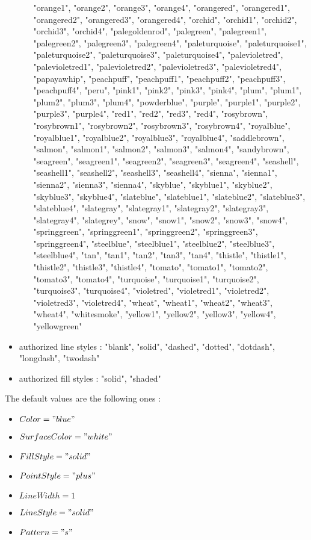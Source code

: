 \begin{itemize}
\begin{itemize}
"orange1", "orange2", "orange3", "orange4", "orangered", "orangered1", "orangered2", "orangered3", "orangered4", "orchid", "orchid1", "orchid2", "orchid3", "orchid4", "palegoldenrod", "palegreen", "palegreen1", "palegreen2", "palegreen3", "palegreen4", "paleturquoise", "paleturquoise1", "paleturquoise2", "paleturquoise3", "paleturquoise4", "palevioletred", "palevioletred1", "palevioletred2", "palevioletred3", "palevioletred4", "papayawhip", "peachpuff", "peachpuff1", "peachpuff2", "peachpuff3", "peachpuff4", "peru", "pink1", "pink2", "pink3", "pink4", "plum", "plum1", "plum2", "plum3", "plum4", "powderblue", "purple", "purple1", "purple2", "purple3", "purple4", "red1", "red2", "red3", "red4", "rosybrown", "rosybrown1", "rosybrown2", "rosybrown3", "rosybrown4", "royalblue", "royalblue1", "royalblue2", "royalblue3", "royalblue4", "saddlebrown", "salmon", "salmon1", "salmon2", "salmon3", "salmon4", "sandybrown", "seagreen", "seagreen1", "seagreen2", "seagreen3", "seagreen4", "seashell", "seashell1", "seashell2", "seashell3", "seashell4", "sienna", "sienna1", "sienna2", "sienna3", "sienna4", "skyblue", "skyblue1", "skyblue2", "skyblue3", "skyblue4", "slateblue", "slateblue1", "slateblue2", "slateblue3", "slateblue4", "slategray", "slategray1", "slategray2", "slategray3", "slategray4", "slategrey", "snow", "snow1", "snow2", "snow3", "snow4", "springgreen", "springgreen1", "springgreen2", "springgreen3", "springgreen4", "steelblue", "steelblue1", "steelblue2", "steelblue3", "steelblue4", "tan", "tan1", "tan2", "tan3", "tan4", "thistle", "thistle1", "thistle2", "thistle3", "thistle4", "tomato", "tomato1", "tomato2", "tomato3", "tomato4", "turquoise", "turquoise1", "turquoise2", "turquoise3", "turquoise4", "violetred", "violetred1", "violetred2", "violetred3", "violetred4", "wheat", "wheat1", "wheat2", "wheat3", "wheat4", "whitesmoke", "yellow1", "yellow2", "yellow3", "yellow4", "yellowgreen"
  \end{itemize}
\item authorized line styles : "blank", "solid", "dashed", "dotted", "dotdash", "longdash",  "twodash"

\item authorized fill styles : "solid", "shaded"
\end{itemize}

The default values are the following ones :
\begin{itemize}
\item $Color = "blue"$
\item $SurfaceColor = "white"$
\item $FillStyle = "solid"$
\item $PointStyle = "plus"$
\item $LineWidth = 1$
\item $LineStyle = "solid"$
\item $Pattern="s"$
\end{itemize}



